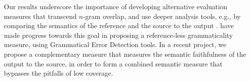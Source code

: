 \documentclass[a4paper]{article}
\begin{document}
Our results underscore the importance of developing alternative evaluation measures that transcend $n$-gram overlap, 
and use deeper analysis tools, e.g., by comparing
the semantics of the reference and the source to the output \cite[cf.][]{lo2011meant}.
have made progress towards this goal in proposing a reference-less grammaticality measure,
using Grammatical Error Detection tools.
In a recent project\cite{choshen2018usim}, we propose a complementary measure that 
measures the semantic faithfulness of the output to the source, in order to form a combined semantic measure 
that bypasses the pitfalls of low coverage.


\end{document}
